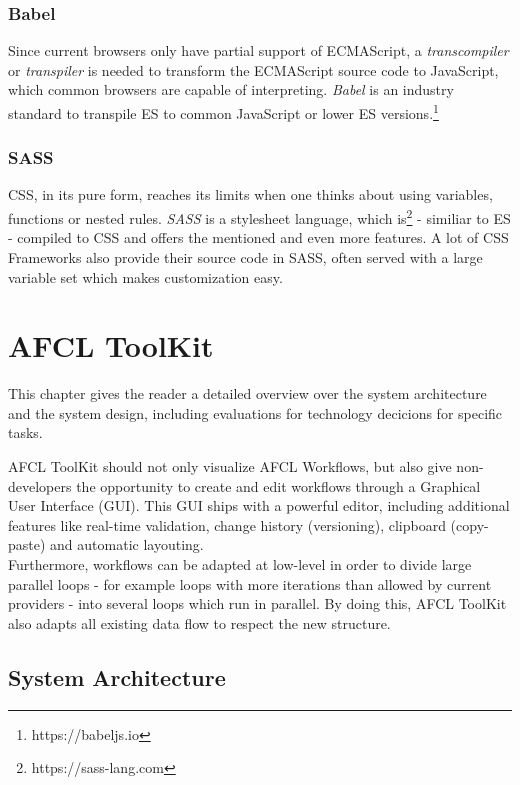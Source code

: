 \documentclass[a4paper,top=25mm,bottom=25mm,12pt,pdftex,halfparskip,twoside,bibtotoc,numbers=noenddot]{scrbook}
\begin{document}
\subsection{Babel}
Since current browsers only have partial support of ECMAScript, a \textit{transcompiler} or \textit{transpiler} is needed to transform the ECMAScript source code to JavaScript, which common browsers are capable of interpreting.
\textit{Babel} is an industry standard to transpile ES to common JavaScript or lower ES versions.\footnote{https://babeljs.io}

\subsection{SASS}

CSS, in its pure form, reaches its limits when one thinks about using variables, functions or nested rules. \textit{SASS} is a stylesheet language, which is\footnote{https://sass-lang.com} - similiar to ES - compiled to CSS and offers the mentioned and even more features.
A lot of CSS Frameworks also provide their source code in SASS, often served with a large variable set which makes customization easy.

\chapter{AFCL ToolKit}

This chapter gives the reader a detailed overview over the system architecture and the system design, including evaluations for technology decicions for specific tasks.

AFCL ToolKit should not only visualize AFCL Workflows, but also give non-developers the opportunity to create and edit workflows through a Graphical User Interface (GUI). This GUI ships with a powerful editor, including additional features like real-time validation, change history (versioning), clipboard (copy-paste) and automatic layouting.\\
Furthermore, workflows can be adapted at low-level in order to divide large parallel loops - for example loops with more iterations than allowed by current providers - into several loops which run in parallel. By doing this, AFCL ToolKit also adapts  all existing data flow to respect the new structure.

\section{System Architecture}
\end{document}

